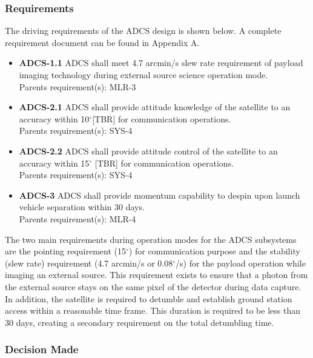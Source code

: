 \documentclass[12pt]{article}
\begin{document}
			\subsubsection{Requirements}
			The driving requirements of the ADCS design is shown below. A complete requirement document can be found in Appendix A. 
					\begin{itemize}
					\item \textbf{ADCS-1.1} ADCS shall meet 4.7 arcmin/s slew rate requirement of payload imaging technology during external source science operation mode.\\
					Parents requirement(s): MLR-3
					
					\item \textbf{ADCS-2.1} ADCS shall provide attitude knowledge of the satellite to an accuracy within 10$^\circ$[TBR]  for communication operations.\\
					Parents requirement(s): SYS-4
					\item \textbf{ADCS-2.2} ADCS shall provide attitude control of the satellite to an accuracy within 15$^\circ$ [TBR] for communication operations.\\
					Parents requirement(s): SYS-4
					\item \textbf{ADCS-3} ADCS shall provide momentum capability to despin upon launch vehicle separation within 30 days.\\
					Parents requirement(s): MLR-4
					\end{itemize}
				The two main requirements during operation modes for the ADCS subsystems are the pointing requirement (15$^\circ$) for communication purpose and the stability (slew rate) requirement (4.7 arcmin/s or 0.08$^\circ$/s) for the payload operation while imaging an external source. This requirement exists to ensure that a photon from the external source stays on the same pixel of the detector during data capture. In addition, the satellite is required to detumble and establish ground station access within a reasonable time frame. This duration is required to be less than 30 days, creating a secondary requirement on the total detumbling time. 
					\subsubsection{Decision Made}
\end{document}
